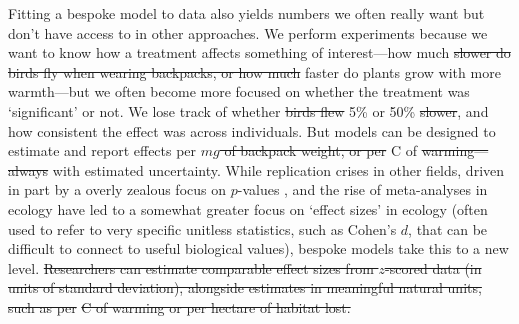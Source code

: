 \documentclass[11pt]{article}
\providecommand{\DIFaddtex}[1]{{\protect\color{blue}\uwave{#1}}} %
\providecommand{\DIFdeltex}[1]{{\protect\color{red}\sout{#1}}}                      %
\providecommand{\DIFaddbegin}{} %
\providecommand{\DIFaddend}{} %
\providecommand{\DIFdelbegin}{} %
\providecommand{\DIFdelend}{} %
\providecommand{\DIFadd}[1]{\texorpdfstring{\DIFaddtex{#1}}{#1}} %
\providecommand{\DIFdel}[1]{\texorpdfstring{\DIFdeltex{#1}}{}} %
\newcommand{\DIFscaledelfig}{0.5}
\newlength{\DIFdelgraphicswidth} %
\newlength{\DIFdelgraphicsheight} %
\newcommand{\DIFaddincludegraphics}[2][]{{\color{blue}\fbox{\DIFOincludegraphics[#1]{#2}}}} %
\newcommand{\DIFdelincludegraphics}[2][]{%
\sbox{\DIFdelgraphicsbox}{\DIFOincludegraphics[#1]{#2}}%
\settoboxwidth{\DIFdelgraphicswidth}{\DIFdelgraphicsbox} %
\settoboxtotalheight{\DIFdelgraphicsheight}{\DIFdelgraphicsbox} %
\scalebox{\DIFscaledelfig}{%
\parbox[b]{\DIFdelgraphicswidth}{\usebox{\DIFdelgraphicsbox}\\[-\baselineskip] \rule{\DIFdelgraphicswidth}{0em}}\llap{\resizebox{\DIFdelgraphicswidth}{\DIFdelgraphicsheight}{%
\setlength{\unitlength}{\DIFdelgraphicswidth}%
\begin{picture}(1,1)%
\thicklines\linethickness{2pt} %
{\color[rgb]{1,0,0}\put(0,0){\framebox(1,1){}}}%
{\color[rgb]{1,0,0}\put(0,0){\line( 1,1){1}}}%
{\color[rgb]{1,0,0}\put(0,1){\line(1,-1){1}}}%
\end{picture}%
}\hspace*{3pt}}} %
} %
\DeclareRobustCommand{\DIFaddbegin}{\DIFOaddbegin \let\includegraphics\DIFaddincludegraphics} %
\DeclareRobustCommand{\DIFaddend}{\DIFOaddend \let\includegraphics\DIFOincludegraphics} %
\DeclareRobustCommand{\DIFdelbegin}{\DIFOdelbegin \let\includegraphics\DIFdelincludegraphics} %
\DeclareRobustCommand{\DIFdelend}{\DIFOaddend \let\includegraphics\DIFOincludegraphics} %
\begin{document}
Fitting a bespoke model to data also yields numbers we often really want but don't have access to in other approaches. We perform experiments because we want to know how a treatment affects something of interest---how much \DIFdelbegin \DIFdel{slower do birds fly when wearing backpacks, or how much }\DIFdelend faster do plants grow with more warmth---but we often become more focused on whether the treatment was `significant' or not. We lose track of whether \DIFdelbegin \DIFdel{birds flew }\DIFdelend \DIFaddbegin \DIFadd{plants grew }\DIFaddend 5\% or 50\% \DIFdelbegin \DIFdel{slower}\DIFdelend \DIFaddbegin \DIFadd{more}\DIFaddend , and how consistent the effect was across individuals. But models can be designed to estimate and report effects per \DIFdelbegin \DIFdel{$mg$ of backpack weight, or per }\DIFdelend \degree C of \DIFdelbegin \DIFdel{warming---always }\DIFdelend \DIFaddbegin \DIFadd{warming }\DIFaddend with estimated uncertainty. While replication crises in other fields, driven in part by a overly zealous focus on $p$-values \citep{halsey2015,loken2017}, and the rise of meta-analyses in ecology \citep{Hampton2013} have led to a somewhat greater focus on `effect sizes' in ecology (often used to refer to very specific unitless statistics, such as Cohen's $d$, that can be difficult to connect to useful biological values), bespoke models take this to a new level.
\DIFdelbegin \DIFdel{Researchers can estimate comparable effect sizes from $z$-scored data (in units of standard deviation), alongside estimates in meaningful natural units, such as per }%
\DIFdel{C of warming or per hectare of habitat lost.
}\DIFdelend %
\end{document}
